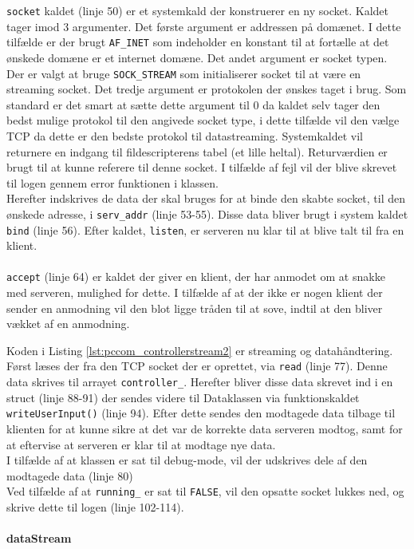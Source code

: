

\texttt{socket} kaldet (linje 50) er et systemkald der konstruerer en ny socket. Kaldet tager imod 3 argumenter. Det første argument er addressen på domænet. I dette tilfælde er der brugt \texttt{AF\_INET} som indeholder en konstant til at fortælle at det ønskede domæne er et internet domæne. Det andet argument er socket typen. Der er valgt at bruge \texttt{SOCK\_STREAM} som initialiserer socket til at være en streaming socket. Det tredje argument er protokolen der ønskes taget i brug. Som standard er det smart at sætte dette argument til 0 da kaldet selv tager den bedst mulige protokol til den angivede socket type, i dette tilfælde vil den vælge TCP da dette er den bedste protokol til datastreaming. Systemkaldet vil returnere en indgang til fildescripterens tabel (et lille heltal). Returværdien er brugt til at kunne referere til denne socket. I tilfælde af fejl vil der blive skrevet til logen gennem error funktionen i klassen.\\
Herefter indskrives de data der skal bruges for at binde den skabte socket, til den ønskede adresse, i \texttt{serv\_addr} (linje 53-55). Disse data bliver brugt i system kaldet \texttt{bind} (linje 56). Efter kaldet, \texttt{listen}, er serveren nu klar til at blive talt til fra en klient.\\\\
\texttt{accept} (linje 64) er kaldet der giver en klient, der har anmodet om at snakke med serveren, mulighed for dette. I tilfælde af at der ikke er nogen klient der sender en anmodning vil den blot ligge tråden til at sove, indtil at den bliver vækket af en anmodning.



Koden i Listing \ref{lst:pccom_controllerstream2} er streaming og datahåndtering. Først læses der fra den TCP socket der er oprettet, via \texttt{read} (linje 77). Denne data skrives til arrayet \texttt{controller\_}. Herefter bliver disse data skrevet ind i en struct (linje 88-91) der sendes videre til Dataklassen via funktionskaldet \texttt{writeUserInput()} (linje 94). Efter dette sendes den modtagede data tilbage til klienten for at kunne sikre at det var de korrekte data serveren modtog, samt for at eftervise at serveren er klar til at modtage nye data.\\
I tilfælde af at klassen er sat til debug-mode, vil der udskrives dele af den modtagede data (linje 80)\\
Ved tilfælde af at \texttt{running\_} er sat til \texttt{FALSE}, vil den opsatte socket lukkes ned, og skrive dette til logen (linje 102-114).

\paragraph{dataStream}